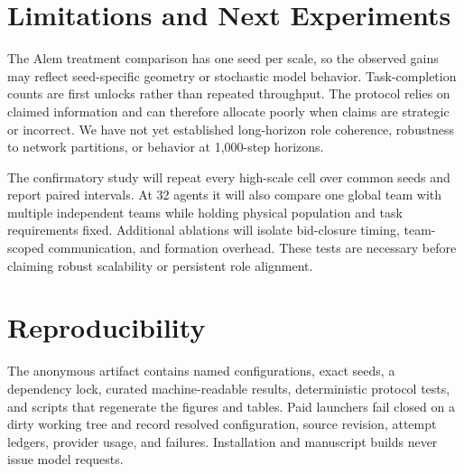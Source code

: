 \documentclass[letterpaper]{article} %
\begin{document}
\section{Limitations and Next Experiments}

The Alem treatment comparison has one seed per scale, so the observed gains may
reflect seed-specific geometry or stochastic model behavior.  Task-completion
counts are first unlocks rather than repeated throughput.  The protocol relies
on claimed information and can therefore allocate poorly when claims are
strategic or incorrect.  We have not yet established long-horizon role
coherence, robustness to network partitions, or behavior at 1,000-step
horizons.

The confirmatory study will repeat every high-scale cell over common seeds and
report paired intervals.  At 32 agents it will also compare one global team
with multiple independent teams while holding physical population and task
requirements fixed.  Additional ablations will isolate bid-closure timing,
team-scoped communication, and formation overhead.  These tests are necessary
before claiming robust scalability or persistent role alignment.

\section{Reproducibility}

The anonymous artifact contains named configurations, exact seeds, a dependency
lock, curated machine-readable results, deterministic protocol tests, and
scripts that regenerate the figures and tables.  Paid launchers fail closed on
a dirty working tree and record resolved configuration, source revision,
attempt ledgers, provider usage, and failures.  Installation and manuscript
builds never issue model requests.


\end{document}

